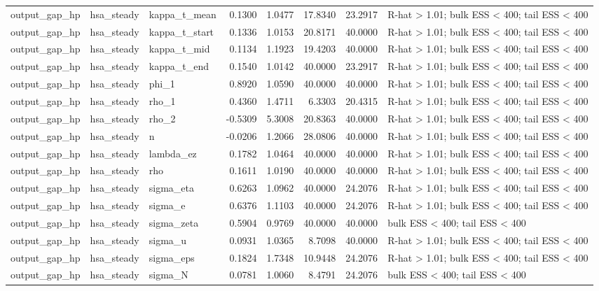\begin{tabular}{lllrrrrl}
output\_gap\_hp & hsa\_steady & kappa\_t\_mean & 0.1300 & 1.0477 & 17.8340 & 23.2917 & R-hat > 1.01; bulk ESS < 400; tail ESS < 400 \\
output\_gap\_hp & hsa\_steady & kappa\_t\_start & 0.1336 & 1.0153 & 20.8171 & 40.0000 & R-hat > 1.01; bulk ESS < 400; tail ESS < 400 \\
output\_gap\_hp & hsa\_steady & kappa\_t\_mid & 0.1134 & 1.1923 & 19.4203 & 40.0000 & R-hat > 1.01; bulk ESS < 400; tail ESS < 400 \\
output\_gap\_hp & hsa\_steady & kappa\_t\_end & 0.1540 & 1.0142 & 40.0000 & 23.2917 & R-hat > 1.01; bulk ESS < 400; tail ESS < 400 \\
output\_gap\_hp & hsa\_steady & phi\_1 & 0.8920 & 1.0590 & 40.0000 & 40.0000 & R-hat > 1.01; bulk ESS < 400; tail ESS < 400 \\
output\_gap\_hp & hsa\_steady & rho\_1 & 0.4360 & 1.4711 & 6.3303 & 20.4315 & R-hat > 1.01; bulk ESS < 400; tail ESS < 400 \\
output\_gap\_hp & hsa\_steady & rho\_2 & -0.5309 & 5.3008 & 20.8363 & 40.0000 & R-hat > 1.01; bulk ESS < 400; tail ESS < 400 \\
output\_gap\_hp & hsa\_steady & n & -0.0206 & 1.2066 & 28.0806 & 40.0000 & R-hat > 1.01; bulk ESS < 400; tail ESS < 400 \\
output\_gap\_hp & hsa\_steady & lambda\_ez & 0.1782 & 1.0464 & 40.0000 & 40.0000 & R-hat > 1.01; bulk ESS < 400; tail ESS < 400 \\
output\_gap\_hp & hsa\_steady & rho & 0.1611 & 1.0190 & 40.0000 & 40.0000 & R-hat > 1.01; bulk ESS < 400; tail ESS < 400 \\
output\_gap\_hp & hsa\_steady & sigma\_eta & 0.6263 & 1.0962 & 40.0000 & 24.2076 & R-hat > 1.01; bulk ESS < 400; tail ESS < 400 \\
output\_gap\_hp & hsa\_steady & sigma\_e & 0.6376 & 1.1103 & 40.0000 & 24.2076 & R-hat > 1.01; bulk ESS < 400; tail ESS < 400 \\
output\_gap\_hp & hsa\_steady & sigma\_zeta & 0.5904 & 0.9769 & 40.0000 & 40.0000 & bulk ESS < 400; tail ESS < 400 \\
output\_gap\_hp & hsa\_steady & sigma\_u & 0.0931 & 1.0365 & 8.7098 & 40.0000 & R-hat > 1.01; bulk ESS < 400; tail ESS < 400 \\
output\_gap\_hp & hsa\_steady & sigma\_eps & 0.1824 & 1.7348 & 10.9448 & 24.2076 & R-hat > 1.01; bulk ESS < 400; tail ESS < 400 \\
output\_gap\_hp & hsa\_steady & sigma\_N & 0.0781 & 1.0060 & 8.4791 & 24.2076 & bulk ESS < 400; tail ESS < 400 \\

\end{tabular}
